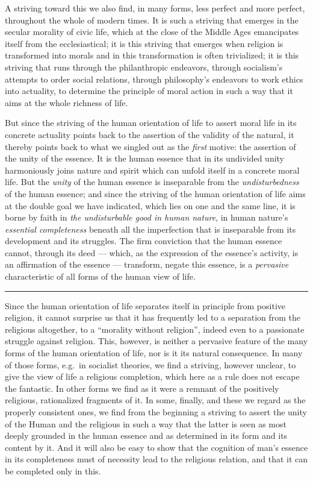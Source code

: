 \documentclass[12pt,a4paper,openany]{book}
\newcommand{\opage}[1]{\marginnote{\footnotesize\textit{[#1]}}}
\begin{document}
\opage{497}A striving toward this we also find, in many forms, less perfect
and more perfect, throughout the whole of modern times. It is such a
striving that emerges in the secular morality of civic life, which at
the close of the Middle Ages emancipates itself from the
ecclesiastical; it is this striving that emerges when religion is
transformed into morals and in this transformation is often
trivialized; it is this striving that runs through the philanthropic
endeavors, through socialism's attempts to order social relations,
through philosophy's endeavors to work ethics into actuality, to
determine the principle of moral action in such a way that it aims at
the whole richness of life.

But since the striving of the human orientation of life to assert
moral life in its concrete actuality points back to the assertion of
the validity of the natural, it thereby points back to what we
singled out as the \emph{first} motive: the assertion of the unity of
the essence. It is the human essence that in its undivided unity
harmoniously joins nature and spirit which can unfold itself in a
concrete moral life. But the \emph{unity} of the human essence is
inseparable from the \emph{undisturbedness} of the human essence; and
since the striving of the human orientation of life aims at the
double goal we have indicated, which lies on one and the same line,
it is borne by faith in \emph{the undisturbable good in human
nature}, in human nature's \emph{essential completeness} beneath all
the imperfection that is inseparable from its development and its
struggles. The firm conviction that the human essence cannot, through
its deed --- which, as the expression of the essence's activity, is an
affirmation of the essence --- transform, negate this essence, is a
\emph{pervasive} characteristic of all forms of the human view of
life.

\begin{center}\rule{1.8cm}{0.4pt}\end{center}

Since the human orientation of life separates itself in principle
from positive religion, it cannot surprise us that it has frequently
led to a separation from the religious altogether, to
\opage{498}a ``morality without religion'', indeed even to a passionate
struggle against religion. This, however, is neither a pervasive
feature of the many forms of the human orientation of life, nor is it
its natural consequence. In many of those forms, e.g.\ in socialist
theories, we find a striving, however unclear, to give the view of
life a religious completion, which here as a rule does not escape the
fantastic. In other forms we find as it were a remnant of the
positively religious, rationalized fragments of it. In some, finally,
and these we regard as the properly consistent ones, we find from the
beginning a striving to assert the unity of the Human and the
religious in such a way that the latter is seen as most deeply
grounded in the human essence and as determined in its form and its
content by it. And it will also be easy to show that the cognition of
man's essence in its completeness must of necessity lead to the
religious relation, and that it can be completed only in this.
\end{document}
